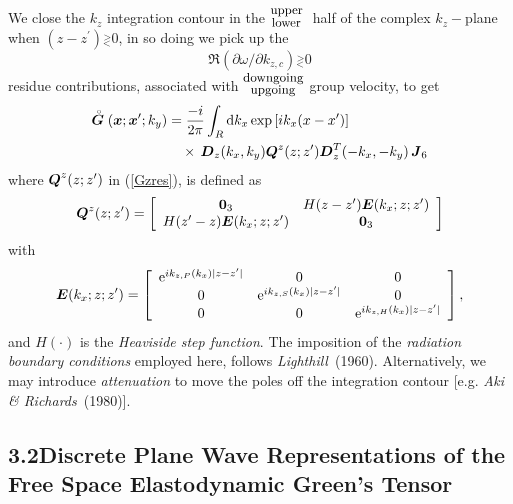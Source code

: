 \documentclass[11pt,a4paper]{article}
\newcommand{\bmi}[1]{\mbox{\boldmath$\mit #1$\unboldmath}}
\newcommand{\rf}[1]{\stackrel{\scriptscriptstyle _{\,\,\circ}}{ #1}}
\newcommand{\gtlt}[0]{\stackrel{\scriptscriptstyle >}{\scriptscriptstyle _<}}
\begin{document}
We  close the
$k_z$ integration contour
in the ${\stackrel{{\mbox{{\small upper }}}}{{}_{\mbox{{\small lower }}}}}$ half of the
complex ${k}_{z}-$plane when
$(z-{z}^{\prime})\gtlt0$, in so doing  we pick up the
\[
\Re(\partial \omega/\partial { k}_{z,c})\gtlt 0
\]
residue contributions, associated with
${\stackrel{\mbox{\small downgoing}}{{}_{\mbox{\small upgoing}}}}$
group velocity, to get
\begin{align} \label{Gzres}
\rf{\bmi  G}({\bmi x};{\bmi x}^{\prime};k_y)&=\frac{- i}{2 \pi}
\int_{R} {\rm d}{ k}_{x} \exp \left[i { k}_{x} ({ x}-{
x}^{\prime})\right] \nonumber\\
&\quad\times\, {\bmi  D}_{z}({k}_{x},{k}_{y})
{\bmi Q}^{z}(z;z^{\prime}){\bmi  D}_{z}^{T}(-{k}_{x},-{k}_{y})
\,{\bmi  J}_6
\end{align}
where
${\bmi Q}^{z}(z;z^{\prime})$ in (\ref{Gzres}),
is defined  as
\begin{equation} \label{Qzdef}
{\bmi Q}^{z}(z;z^{\prime})=
\left[{\begin{array}{cc}{\bf 0}_{3}&H(z-{z}^{\prime}){\bmi E}(k_x;z;{z}^{\prime})\\
H(z^{\prime}-{z}){\bmi E}(k_x;z;{z}^{\prime})&{\bf 0}_{3}\end{array}}\right]
\end{equation}
with
\begin{equation} \label{Ek1def}
{\bmi E}(k_x;z;{z}^{\prime})=\left[{\begin{array}{ccc}
{\rm e}^{i{ k}_{z,P}(k_{x})|z-{z}^{\prime}|}&{ 0}&{ 0}\\
{ 0}&{\rm e}^{
i{ k}_{z,S}(k_{x})|z-{z}^{\prime}|}&{ 0}\\ { 0}&{ 0}&{\rm e}^{
i{ k}_{z,H}(k_{x})|z-{z}^{\prime}|}\end{array}}\right] ,
\end{equation}
and $H(\cdot)$ is the {\em Heaviside step function\/}.
The imposition of the {\em radiation boundary conditions\/} employed here,
follows {\em Lighthill}~(1960). Alternatively,  we may
 introduce {\em attenuation\/} to move the
poles off the integration contour [e.g. {\em Aki \& Richards\/}~(1980)].

\newpage

\subsection*{3.2\quad Discrete Plane Wave Representations of the Free Space Elastodynamic Green's Tensor}
\end{document}

